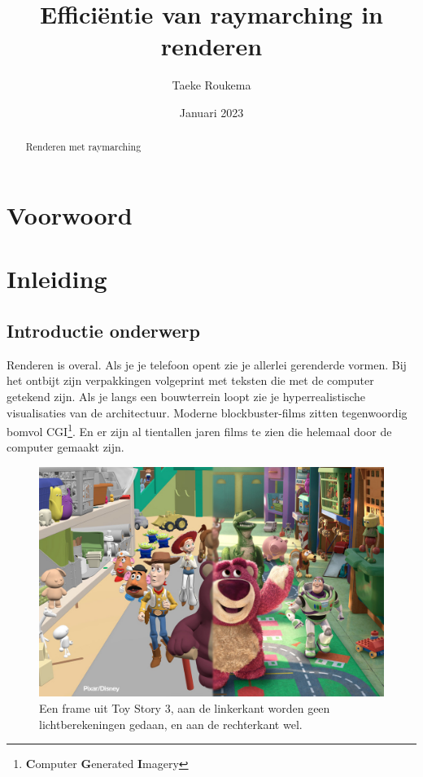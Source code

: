 \documentclass[12pt, a4paper]{article}
\title{Efficiëntie van raymarching in renderen}
\author{Taeke Roukema}
\date{Januari 2023}
\begin{document}
\maketitle
\begin{abstract}
Renderen met raymarching
\end{abstract}
\clearpage
\tableofcontents{}
\clearpage
\section{Voorwoord}
\clearpage
\section{Inleiding}
\subsection{Introductie onderwerp}

Renderen is overal. Als je je telefoon opent zie je allerlei gerenderde vormen. Bij het ontbijt zijn verpakkingen volgeprint met teksten die met de computer getekend zijn. Als je langs een bouwterrein loopt zie je hyperrealistische visualisaties van de architectuur. Moderne blockbuster-films zitten tegenwoordig bomvol CGI\footnote{\textbf{C}omputer \textbf{G}enerated \textbf{I}magery}. En er zijn al tientallen jaren films te zien die helemaal door de computer gemaakt zijn. 

\begin{figure}
    \includegraphics[width=1\linewidth]{toystory3comparison.jpg}
    \caption{Een frame uit Toy Story 3, aan de linkerkant worden geen lichtberekeningen gedaan, en aan de rechterkant wel.}
    \label{fig:toystory3}
\end{figure}
\end{document}
